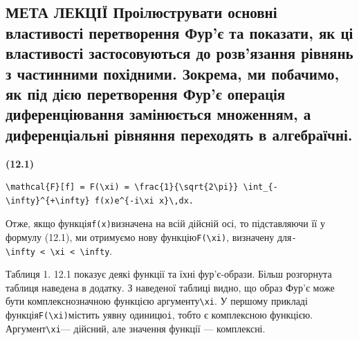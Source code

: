 \documentclass[
  ukrainian,
]{article}
\begin{document}
\subsection{МЕТА ЛЕКЦІЇ Проілюструвати основні властивості перетворення
Фур'є та показати, як ці властивості застосовуються до розв'язання
рівнянь з частинними похідними. Зокрема, ми побачимо, як під дією
перетворення Фур'є операція диференціювання замінюється множенням, а
диференціальні рівняння переходять в
алгебраїчні.}\label{ux43cux435ux442ux430-ux43bux435ux43aux446ux456ux457-ux43fux440ux43eux456ux43bux44eux441ux442ux440ux443ux432ux430ux442ux438-ux43eux441ux43dux43eux432ux43dux456-ux432ux43bux430ux441ux442ux438ux432ux43eux441ux442ux456-ux43fux435ux440ux435ux442ux432ux43eux440ux435ux43dux43dux44f-ux444ux443ux440ux454-ux442ux430-ux43fux43eux43aux430ux437ux430ux442ux438-ux44fux43a-ux446ux456-ux432ux43bux430ux441ux442ux438ux432ux43eux441ux442ux456-ux437ux430ux441ux442ux43eux441ux43eux432ux443ux44eux442ux44cux441ux44f-ux434ux43e-ux440ux43eux437ux432ux44fux437ux430ux43dux43dux44f-ux440ux456ux432ux43dux44fux43dux44c-ux437-ux447ux430ux441ux442ux438ux43dux43dux438ux43cux438-ux43fux43eux445ux456ux434ux43dux438ux43cux438.-ux437ux43eux43aux440ux435ux43cux430-ux43cux438-ux43fux43eux431ux430ux447ux438ux43cux43e-ux44fux43a-ux43fux456ux434-ux434ux456ux454ux44e-ux43fux435ux440ux435ux442ux432ux43eux440ux435ux43dux43dux44f-ux444ux443ux440ux454-ux43eux43fux435ux440ux430ux446ux456ux44f-ux434ux438ux444ux435ux440ux435ux43dux446ux456ux44eux432ux430ux43dux43dux44f-ux437ux430ux43cux456ux43dux44eux454ux442ux44cux441ux44f-ux43cux43dux43eux436ux435ux43dux43dux44fux43c-ux430-ux434ux438ux444ux435ux440ux435ux43dux446ux456ux430ux43bux44cux43dux456-ux440ux456ux432ux43dux44fux43dux43dux44f-ux43fux435ux440ux435ux445ux43eux434ux44fux442ux44c-ux432-ux430ux43bux433ux435ux431ux440ux430ux457ux447ux43dux456.}

\textbf{(12.1)}

\begin{verbatim}
\mathcal{F}[f] = F(\xi) = \frac{1}{\sqrt{2\pi}} \int_{-\infty}^{+\infty} f(x)e^{-i\xi x}\,dx.
\end{verbatim}

Отже, якщо функція\texttt{f(x)}визначена на всій дійсній осі, то
підставляючи її у формулу (12.1), ми отримуємо нову
функцію\texttt{F(\textbackslash{}xi)}, визначену
для\texttt{-\textbackslash{}infty\ \textless{}\ \textbackslash{}xi\ \textless{}\ \textbackslash{}infty}.

Таблиця 1. 12.1 показує деякі функції та їхні фур'є-образи. Більш
розгорнута таблиця наведена в додатку. З наведеної таблиці видно, що
образ Фур'є може бути комплекснозначною функцією
аргументу\texttt{\textbackslash{}xi}. У першому прикладі
функція\texttt{F(\textbackslash{}xi)}містить уявну одиницю\texttt{i},
тобто є комплексною функцією. Аргумент\texttt{\textbackslash{}xi}---
дійсний, але значення функції --- комплексні.
\end{document}
